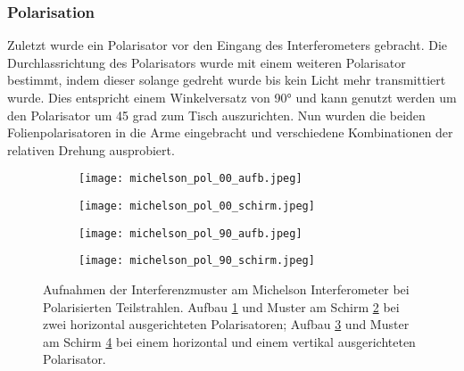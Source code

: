 \subsubsection{Polarisation}
Zuletzt wurde ein Polarisator vor den Eingang des Interferometers gebracht. 
Die Durchlassrichtung des Polarisators wurde mit einem weiteren Polarisator bestimmt, indem dieser solange gedreht wurde bis kein Licht mehr transmittiert wurde.
Dies entspricht einem Winkelversatz von 90° und kann genutzt werden um den Polarisator um 45 grad zum Tisch auszurichten.
Nun wurden die beiden Folienpolarisatoren in die Arme eingebracht und verschiedene Kombinationen der relativen Drehung ausprobiert.
\begin{figure}[h]
    \centering
    \begin{subfigure}[t]{0.4\textwidth}
        \texttt{[image: michelson\_pol\_00\_aufb.jpeg]}
        \caption{}
        \label{fig:michelson_pol_00_aufb}
    \end{subfigure}%
    \begin{subfigure}[t]{0.4\textwidth}
        \texttt{[image: michelson\_pol\_00\_schirm.jpeg]}
        \caption{}
        \label{fig:michelson_pol_00_schirm}
    \end{subfigure}
    \begin{subfigure}[t]{0.4\textwidth}
        \texttt{[image: michelson\_pol\_90\_aufb.jpeg]}
        \caption{}
        \label{fig:michelson_pol_90_aufb}
    \end{subfigure}%
    \begin{subfigure}[t]{0.4\textwidth}
        \texttt{[image: michelson\_pol\_90\_schirm.jpeg]}
        \caption{}
        \label{fig:michelson_pol_90_schirm}
    \end{subfigure}

    \caption{
        Aufnahmen der Interferenzmuster am Michelson Interferometer bei Polarisierten Teilstrahlen.
        Aufbau \ref{fig:michelson_pol_00_aufb} und Muster am Schirm \ref{fig:michelson_pol_00_schirm} bei zwei horizontal ausgerichteten Polarisatoren; 
        Aufbau \ref{fig:michelson_pol_90_aufb} und Muster am Schirm \ref{fig:michelson_pol_90_schirm} bei einem horizontal  und einem vertikal ausgerichteten Polarisator.
    }
    \label{fig:michelson_pol}
\end{figure}


\newpage